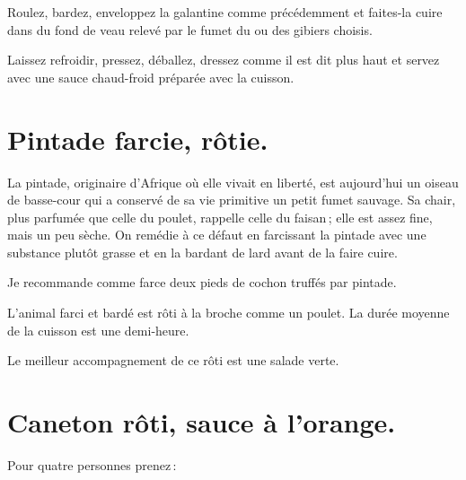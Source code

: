 Roulez, bardez, enveloppez la galantine comme précédemment et faites-la cuire
dans du fond de veau relevé par le fumet du ou des gibiers choisis.

Laissez refroidir, pressez, déballez, dressez comme il est dit plus haut et
servez avec une sauce chaud-froid préparée avec la cuisson.

\section*{\centering Pintade farcie, rôtie.}
{}

La pintade, originaire d'Afrique où elle vivait en liberté, est aujourd'hui un
oiseau de basse-cour qui a conservé de sa vie primitive un petit fumet sauvage.
Sa chair, plus parfumée que celle du poulet, rappelle celle du faisan ; elle
est assez fine, mais un peu sèche. On remédie à ce défaut en farcissant la pintade avec une
substance plutôt grasse et en la bardant de lard avant de la faire cuire.

Je recommande comme farce deux pieds de cochon truffés par pintade.

L'animal farci et bardé est rôti à la broche comme un poulet. La durée moyenne
de la cuisson est une demi-heure.

Le meilleur accompagnement de ce rôti est une salade verte.

\section*{\centering Caneton rôti, sauce à l'orange.}
{}

Pour quatre personnes prenez :


